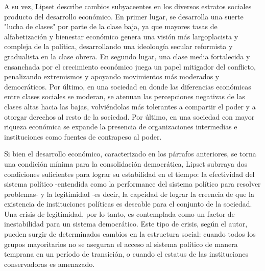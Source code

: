 \documentclass{article}
\begin{document}
A su vez, Lipset describe cambios subyaceentes en los diversos estratos sociales producto
del desarrollo económico. En primer lugar, se desarrolla una suerte "lucha de clases" por 
parte de la clase baja, ya que mayores tasas de alfabetización y bienestar económico genera 
una visión más largoplacista y compleja de la política, desarrollando una ideoloogía secular
reformista y gradualista en la clase obrera. En segundo lugar, una clase media fortalecida y 
ensanchada por el crecimiento económico juega un papel mitigador del conflicto, penalizando 
extremismos y apoyando movimientos más moderados y democráticos. Por último, en una sociedad 
en donde las diferencias económicas entre clases sociales se moderan, se atenuan las 
percepciones negativas de las clases altas hacia las bajas, volviéndolas más tolerantes a 
compartir el poder y a otorgar derechos al resto de la sociedad. Por último, en una sociedad 
con mayor riqueza económica se expande la presencia de organizaciones intermedias e 
instituciones como fuentes de contrapeso al poder.

Si bien el desarrollo económico, caracterizado en los párrafos anteriores, se torna una
condición mínima para la consolidación democrática, Lipset subrraya dos condiciones suficientes
para lograr su estabilidad en el tiempo: la efectividad del sistema político -entendida como la 
performance del sistema político para resolver problemas- y la legitimidad -es decir, la capcidad 
de lograr la creencia de que la  existencia de instituciones políticas es deseable para el 
conjunto de la sociedad. Una crisis de legitimidad, por lo tanto, es contemplada como un factor 
de inestabilidad para un sistema democrático. Este tipo de crisis, según el autor, pueden surgir 
de determinados cambios en la estructura social: cuando todos los grupos mayoritarios no se 
aseguran el acceso al sistema político de manera temprana en un período de transición, o cuando 
el estatus de las instituciones conservadoras es amenazado.


\end{document}
